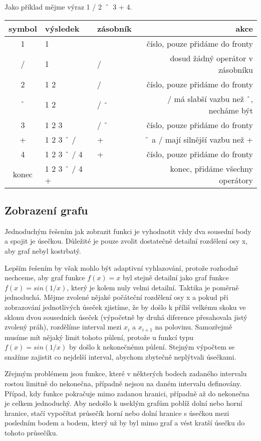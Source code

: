\documentclass[11pt]{article}
\newcommand\CARET{\mathbin{\char`\^}}
\begin{document}
Jako příklad mějme výraz 1 / 2~$\CARET$~3 + 4.
\begin{center}
\begin{tabular}{|c|l|l|r|}
\hline
symbol & výsledek & zásobník & akce \\
\hline
1 & 1 & & číslo, pouze přidáme do fronty \\
/ & 1 & / & dosud žádný operátor v zásobníku\\
2 & 1 2 & / & číslo, pouze přidáme do fronty \\
$\CARET$ & 1 2 & / $\CARET$ & / má slabší vazbu než $\CARET$, necháme být \\
3 & 1 2 3 & / $\CARET$ & číslo, pouze přidáme do fronty \\
+ & 1 2 3 $\CARET$ / & + & $\CARET$ a / mají silnější vazbu než + \\
4 & 1 2 3 $\CARET$ / 4 & + & číslo, pouze přidáme do fronty \\
konec  & 1 2 3 $\CARET$ / 4 + & & konec, přidáme všechny operátory \\

\hline
\end{tabular}
\end{center}

\subsection{Zobrazení grafu}
Jednoduchým řešením jak zobrazit funkci je vyhodnotit vždy dva sousední body a
spojit je úsečkou. Důležité je pouze zvolit dostatečně detailní rozdělení osy
x, aby graf nebyl kostrbatý.

Lepším řešením by však mohlo být adaptivní vyhlazování, protože rozhodně
nechceme, aby graf funkce $f(x) = x$ byl stejně detailní jako graf funkce $f(x)
= sin(1/x)$, který je kolem nuly velmi detailní. Taktika je poměrně jednoduchá.
Mějme zvolené nějaké počáteční rozdělení osy x a pokud při zobrazování
jednotlivých úseček zjistíme, že by došlo k příliš velkému skoku ve sklonu dvou
sousedních úseček (výpočetně by druhá diference přesahovala jistý zvolený
práh), rozdělíme interval mezi $x_i$ a $x_{i + 1}$ na polovinu. Samozřejmě
musíme mít nějaký limit tohoto půlení, protože u funkcí typu $f(x) = sin(1/x)$
by došlo k nekonečnému půlení. Stejným výpočtem se snažíme zajistit co nejdelší
interval, abychom zbytečně neplýtvali úsečkami. 

Zřejmým problémem jsou funkce, které v některých bodech zadaného intervalu
rostou limitně do nekonečna, případně nejsou na daném intervalu definovány.
Případ, kdy funkce pokračuje mimo zadanou hranici, případně až do nekonečna je
celkem jednoduchý. Aby nedošlo k useklým grafům poblíž dolní nebo horní
hranice, stačí vypočítat průsečík horní nebo dolní hranice s úsečkou mezi
posledním bodem a bodem, který už by byl mimo graf a vést kratší úsečku do
tohoto průsečíku. 
\end{document}
